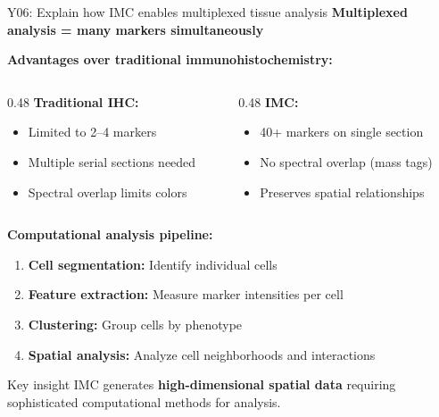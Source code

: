 \documentclass[aspectratio=169, 10pt]{beamer}
\begin{document}
\begin{frame}{Y06: Explain how IMC enables multiplexed tissue analysis}
    \textbf{Multiplexed analysis = many markers simultaneously}
    
    \vspace{0.2cm}
    \textbf{Advantages over traditional immunohistochemistry:}
    \begin{columns}[T]
        \begin{column}{0.48\textwidth}
            \textbf{Traditional IHC:}
            \begin{itemize}
                \item Limited to 2--4 markers
                \item Multiple serial sections needed
                \item Spectral overlap limits colors
            \end{itemize}
        \end{column}
        \begin{column}{0.48\textwidth}
            \textbf{IMC:}
            \begin{itemize}
                \item 40+ markers on single section
                \item No spectral overlap (mass tags)
                \item Preserves spatial relationships
            \end{itemize}
        \end{column}
    \end{columns}
    
    \vspace{0.3cm}
    \textbf{Computational analysis pipeline:}
    \begin{enumerate}
        \item \textbf{Cell segmentation:} Identify individual cells
        \item \textbf{Feature extraction:} Measure marker intensities per cell
        \item \textbf{Clustering:} Group cells by phenotype
        \item \textbf{Spatial analysis:} Analyze cell neighborhoods and interactions
    \end{enumerate}
    
    \begin{block}{Key insight}
        IMC generates \textbf{high-dimensional spatial data} requiring sophisticated computational methods for analysis.
    \end{block}
\end{frame}
\end{document}
